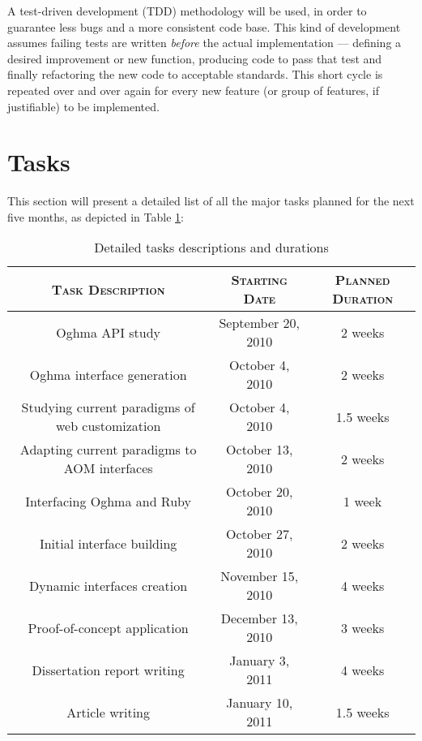 A test-driven development (TDD) methodology will be used, in order to guarantee less bugs and a more consistent code base. This kind of development assumes failing tests are written \emph{before} the actual implementation --- defining a desired improvement or new function, producing code to pass that test and finally refactoring the new code to acceptable standards. This short cycle is repeated over and over again for every new feature (or group of features, if justifiable) to be implemented.

\section{Tasks}\label{sec:tasks}

This section will present a detailed list of all the major tasks planned for the next five months, as depicted in Table \ref{table:tasks}:

\begin{table}[H]
  \centering
  \begin{tabular}{c|c|c}
    \textbf{\textsc{Task Description}} & \textbf{\textsc{Starting Date}} & \textbf{\textsc{Planned Duration}}\\
    \hline
    \hline
    Oghma API study                                 & September 20, 2010  & 2 weeks\\\hline
    Oghma interface generation                      & October 4, 2010     & 2 weeks\\\hline
    Studying current paradigms of web customization & October 4, 2010     & 1.5 weeks\\\hline
    Adapting current paradigms to AOM interfaces    & October 13, 2010    & 2 weeks\\\hline
    Interfacing Oghma and Ruby                      & October 20, 2010    & 1 week\\\hline
    Initial interface building                      & October 27, 2010    & 2 weeks\\\hline
    Dynamic interfaces creation                     & November 15, 2010   & 4 weeks\\\hline
    Proof-of-concept application                    & December 13, 2010   & 3 weeks\\\hline
    Dissertation report writing                     & January 3, 2011     & 4 weeks\\\hline
    Article writing                                 & January 10, 2011    & 1.5 weeks\\\hline
  \end{tabular}
  \vspace{3mm}
  \caption{Detailed tasks descriptions and durations}
  \label{table:tasks}
\end{table}

